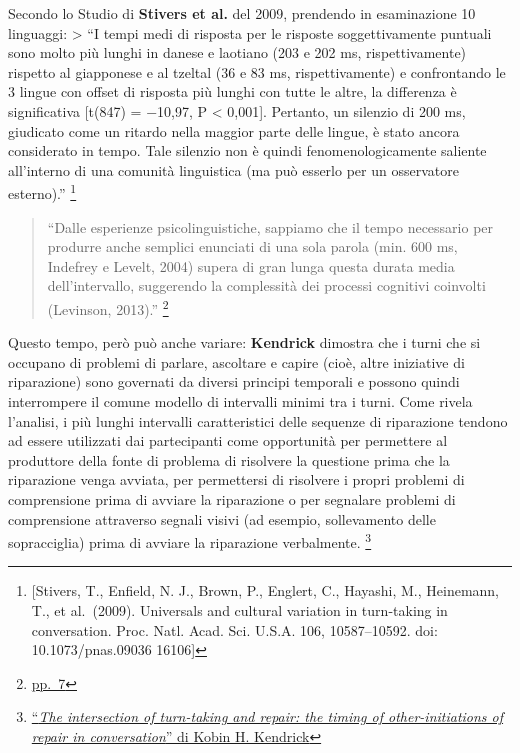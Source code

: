 \documentclass[
]{article}
\begin{document}
Secondo lo Studio di \textbf{Stivers et al.} del 2009, prendendo in esaminazione 10 linguaggi: \textgreater{} ``I tempi medi di risposta per le risposte soggettivamente puntuali sono molto più lunghi in danese e laotiano (203 e 202 ms, rispettivamente) rispetto al giapponese e al tzeltal (36 e 83 ms, rispettivamente) e confrontando le 3 lingue con offset di risposta più lunghi con tutte le altre, la differenza è significativa {[}t(847) = −10,97, P \textless{} 0,001{]}. Pertanto, un silenzio di 200 ms, giudicato come un ritardo nella maggior parte delle lingue, è stato ancora considerato in tempo. Tale silenzio non è quindi fenomenologicamente saliente all'interno di una comunità linguistica (ma può esserlo per un osservatore esterno).'' \footnote{{[}Stivers, T., Enfield, N. J., Brown, P., Englert, C., Hayashi, M., Heinemann, T., et al.~(2009). Universals and cultural variation in turn-taking in conversation. Proc. Natl. Acad. Sci. U.S.A. 106, 10587--10592. doi: 10.1073/pnas.09036 16106{]}}

\begin{quote}
``Dalle esperienze psicolinguistiche, sappiamo che il tempo necessario per produrre anche semplici enunciati di una sola parola (min. 600 ms, Indefrey e Levelt, 2004) supera di gran lunga questa durata media dell'intervallo, suggerendo la complessità dei processi cognitivi coinvolti (Levinson, 2013).'' \footnote{\href{DOC/608110.pdf}{pp.~7}}
\end{quote}

Questo tempo, però può anche variare: \textbf{Kendrick} dimostra che i turni che si occupano di problemi di parlare, ascoltare e capire (cioè, altre iniziative di riparazione) sono governati da diversi principi temporali e possono quindi interrompere il comune modello di intervalli minimi tra i turni. Come rivela l'analisi, i più lunghi intervalli caratteristici delle sequenze di riparazione tendono ad essere utilizzati dai partecipanti come opportunità per permettere al produttore della fonte di problema di risolvere la questione prima che la riparazione venga avviata, per permettersi di risolvere i propri problemi di comprensione prima di avviare la riparazione o per segnalare problemi di comprensione attraverso segnali visivi (ad esempio, sollevamento delle sopracciglia) prima di avviare la riparazione verbalmente. \footnote{\href{https://www.frontiersin.org/articles/10.3389/fpsyg.2015.00250/full}{``\emph{The intersection of turn-taking and repair: the timing of other-initiations of repair in conversation}'' di Kobin H. Kendrick}}
\end{document}
